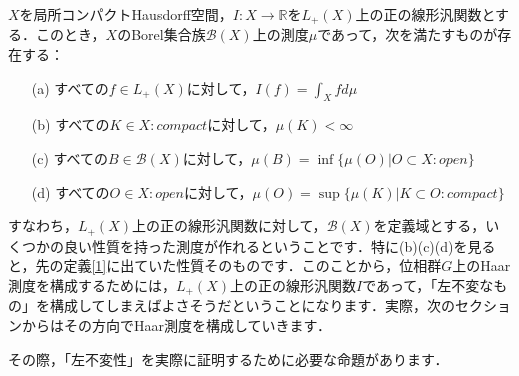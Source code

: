 \begin{thm}[Rieszの表現定理]\label{9}
$X$を局所コンパクトHausdorff空間，$I \colon X \to \mathbb{R}$を$L_{+}(X)$上の正の線形汎関数とする．このとき，$X$のBorel集合族$\mathscr{B}(X)$上の測度$\mu$であって，次を満たすものが存在する：
\begin{itemize}
 \item[(a)]すべての$f \in L_{+}(X)$に対して，$I(f)=\int_{X}fd\mu$
 \item[(b)]すべての$K \in X \colon compact$に対して，$\mu(K)<\infty$
 \item[(c)]すべての$B \in \mathscr{B}(X)$に対して，$\mu(B)=\inf \{ \mu(O) | O \subset X \colon open \}$
 \item[(d)]すべての$O \in X \colon open$に対して，$\mu(O)=\sup \{ \mu(K) | K \subset O \colon compact \}$
\end{itemize}
\end{thm}
すなわち，$L_{+}(X)$上の正の線形汎関数に対して，$\mathscr{B}(X)$を定義域とする，いくつかの良い性質を持った測度が作れるということです．特に(b)(c)(d)を見ると，先の定義\ref{1}に出ていた性質そのものです．このことから，位相群$G$上のHaar測度を構成するためには，$L_{+}(X)$上の正の線形汎関数$I$であって，「左不変なもの」を構成してしまえばよさそうだということになります．実際，次のセクションからはその方向でHaar測度を構成していきます．

その際，「左不変性」を実際に証明するために必要な命題があります．

